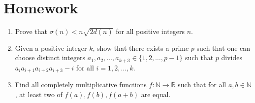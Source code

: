 \documentclass{article}
\begin{document}
\section{Homework}
\begin{enumerate}
  \item Prove that $\sigma(n)<n\sqrt{2d(n)}$ for all positive integers $n$.
  \item Given a positive integer $k$, show that there exists a prime $p$ such
    that one can choose distinct integers
    $a_1,a_2,\ldots,a_{k+3}\in\{1,2,\ldots,p-1\}$ such that $p$ divides
    $a_i a_{i+1}a_{i+2}a_{i+3}-i$ for all $i=1,2,\ldots,k$.
  \item Find all completely multiplicative functions $f:\mathbb N\to\mathbb R$
    such that for all $a,b\in\mathbb N$, at least two of $f(a),f(b),f(a+b)$ are
    equal.
\end{enumerate}
\end{document}
